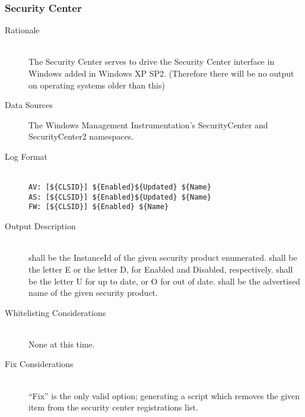 \subsubsection{Security Center}
\begin{description}
\item[Rationale] \hfill \\
The Security Center serves to drive the Security Center interface in Windows
added in Windows XP SP2. (Therefore there will be no output on operating
systems older than this)
\item[Data Sources] \hfill
The Windows Management Instrumentation's SecurityCenter and SecurityCenter2
namespaces.
\item[Log Format] \hfill \\
\verb|AV: [${CLSID}] ${Enabled}${Updated} ${Name}| \\
\verb|AS: [${CLSID}] ${Enabled}${Updated} ${Name}| \\
\verb|FW: [${CLSID}] ${Enabled} ${Name}|
\item[Output Description] \hfill \\
 shall be the InstanceId of the given security product enumerated.
 shall be the letter E or the letter D, for Enabled and Disabled,
respectively.  shall be the letter U for up to date, or O for out
of date.  shall be the advertised name of the given security product.
\item[Whitelisting Considerations] \hfill \\
None at this time.
\item[Fix Considerations] \hfill \\
``Fix'' is the only valid option; generating a script which removes the given
item from the security center registrations list.
\end{description}

